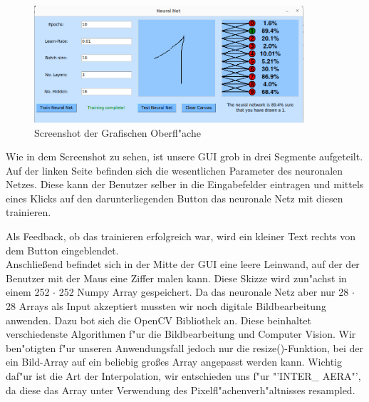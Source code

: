 \documentclass[12pt,a4paper]{scrartcl}
\begin{document}
\begin{figure}[h]
	\centering
	\includegraphics[width=10cm]{screens/gui.png}
	\caption{Screenshot der Grafischen Oberfl"ache} \label{screen_gui}
\end{figure}

Wie in dem Screenshot zu sehen, ist unsere GUI grob in drei Segmente aufgeteilt. Auf der linken Seite befinden sich die wesentlichen Parameter des neuronalen Netzes. Diese kann der Benutzer selber in die Eingabefelder eintragen und mittels eines Klicks auf den darunterliegenden Button das neuronale Netz mit diesen trainieren. 

\pagebreak

Als Feedback, ob das trainieren erfolgreich war, wird ein kleiner Text rechts von dem Button eingeblendet.\\

Anschlie\ss end befindet sich in der Mitte der GUI eine leere Leinwand, auf der der Benutzer mit der Maus eine Ziffer malen kann. Diese Skizze wird zun"achst in einem 252 $ \cdot$ 252 Numpy Array gespeichert. Da das neuronale Netz aber nur 28 $\cdot$ 28 Arrays als Input akzeptiert mussten wir noch digitale Bildbearbeitung anwenden. Dazu bot sich die OpenCV Bibliothek an. Diese beinhaltet verschiedenste Algorithmen f"ur die Bildbearbeitung und Computer Vision. Wir ben"otigten f"ur unseren Anwendungsfall jedoch nur die resize()-Funktion, bei der ein Bild-Array auf ein beliebig gro\ss es Array angepasst werden kann. Wichtig daf"ur ist die Art der Interpolation, wir entschieden uns f"ur "'INTER\_ AERA"', da diese das Array unter Verwendung des Pixelfl"achenverh"altnisses resampled. \\
\end{document}

